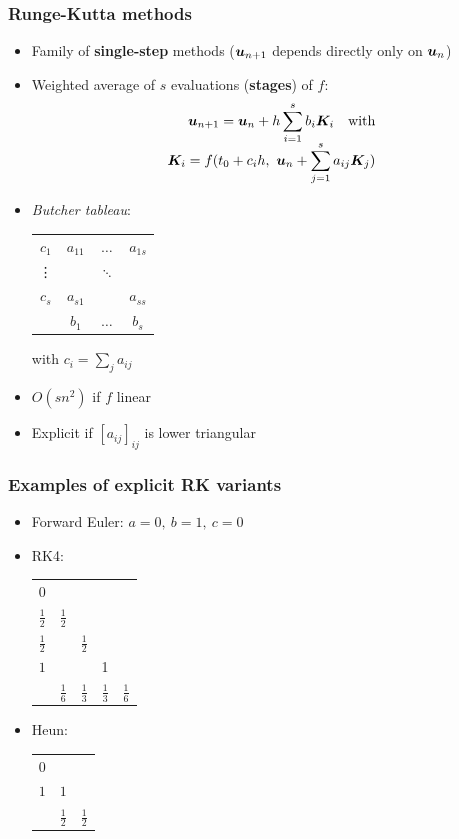 \documentclass{beamer}
\begin{document}
\begin{frame} %
	\frametitle{Runge-Kutta methods}
	\begin{itemize}
		\item Family of \textbf{single-step} methods ($\boldsymbol u_{n+1}$ depends directly only on $\boldsymbol u_n$)
		\item Weighted average of $s$ evaluations (\textbf{stages}) of $f$: \\[-20pt]
		\begin{align*}
			\boldsymbol u_{n+1} = \boldsymbol u_{n} + h \sum_{i=1}^s b_i \boldsymbol K_i \quad \text{with} \\[-5pt]
			\boldsymbol K_i = f(t_0 + c_i h, \ \boldsymbol u_n + \sum_{j=1}^s a_{ij} \boldsymbol K_j)
		\end{align*}
		\pause
		\vspace{-22pt}
		\item \textit{Butcher tableau}:
		\begin{center}
			\begin{tabular}{c|ccc}
				$c_1$ & $a_{11}$ & $\dots$ & $a_{1s}$ \\
				\vdots & & $\ddots$ & \\
				$c_s$ & $a_{s1}$ & & $a_{ss}$ \\
				\hline
				& $b_1$ & $\dots$ & $b_s$
			\end{tabular}
		\hspace{30pt} with $c_i = \sum_j a_{ij}$
		\pause
		\end{center}
		\item $O(s n^2)$ if $f$ linear
		\item Explicit if $[a_{ij}]_{ij}$ is lower triangular
	\end{itemize}
\end{frame}


\begin{frame} %
	\frametitle{Examples of explicit RK variants}
	\begin{itemize}
		\item Forward Euler: $ a = 0, \ b = 1, \ c = 0 $
		\item RK4: \\
		\begin{center}
			\begin{tabular}{c|cccc}
				$0$ & & & & \\
				$\frac 1 2$ & $\frac 1 2$ & & & \\
				$\frac 1 2$ & & $\frac 1 2$ & & \\
				$1$ & & & 1 & \\
				\hline
				& $\frac 1 6$ & $\frac 1 3$ & $\frac 1 3$ & $\frac 1 6$
				\end{tabular}
		\end{center}
		\item Heun:
		\begin{center}
			\begin{tabular}{c|cc}
				$0$ &     & \\
				$1$ & $1$ & \\
				\hline
				& $\frac 1 2$ & $\frac 1 2$
			\end{tabular}
		\end{center}	
	\end{itemize}
\end{frame}
\end{document}

